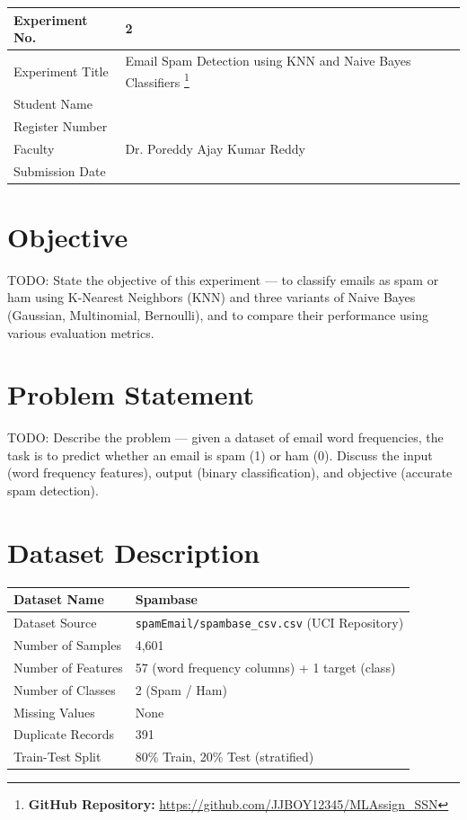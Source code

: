\documentclass[12pt,a4paper]{article}
\begin{document}
\begin{tabular}{|p{4cm}|p{11cm}|}
\hline
Experiment No. & 2 \\ \hline
Experiment Title &
Email Spam Detection using KNN and Naive Bayes Classifiers
\footnote{\textbf{GitHub Repository: }\url{https://github.com/JJBOY12345/MLAssign_SSN}}\\ \hline
Student Name & \\ \hline
Register Number & \\ \hline
Faculty & Dr. Poreddy Ajay Kumar Reddy \\ \hline
Submission Date & \\ \hline
\end{tabular}

\section{Objective}
TODO: State the objective of this experiment — to classify emails as spam or ham using K-Nearest Neighbors (KNN) and three variants of Naive Bayes (Gaussian, Multinomial, Bernoulli), and to compare their performance using various evaluation metrics.

\section{Problem Statement}
TODO: Describe the problem — given a dataset of email word frequencies, the task is to predict whether an email is spam (1) or ham (0). Discuss the input (word frequency features), output (binary classification), and objective (accurate spam detection).

\section{Dataset Description}
\begin{longtable}{|p{5cm}|p{9cm}|}
\hline
Dataset Name & Spambase \\ \hline
Dataset Source & \texttt{spamEmail/spambase\_csv.csv} (UCI Repository) \\ \hline
Number of Samples & 4,601 \\ \hline
Number of Features & 57 (word frequency columns) + 1 target (class) \\ \hline
Number of Classes & 2 (Spam / Ham) \\ \hline
Missing Values & None \\ \hline
Duplicate Records & 391 \\ \hline
Train-Test Split & 80\% Train, 20\% Test (stratified) \\ \hline
\end{longtable}
\end{document}
